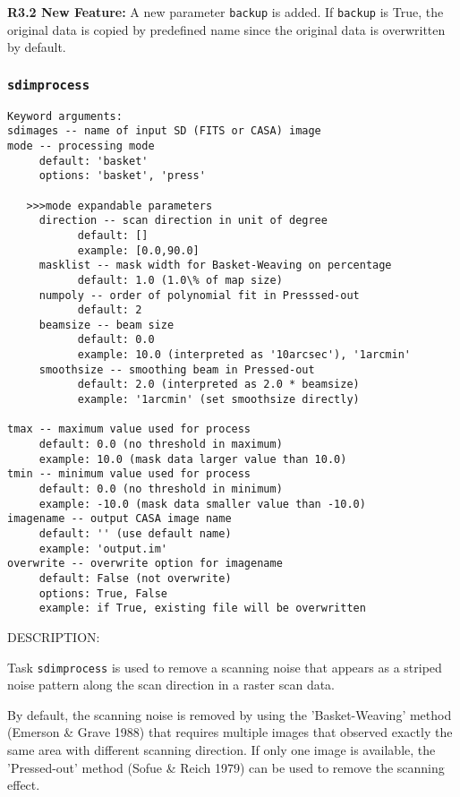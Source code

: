 \medskip
        {\bf R3.2 New Feature:}
        A new parameter {\tt backup} is added. If {\tt backup} is True, the original data is copied 
        by predefined name since the original data is overwritten by default.


\subsubsection{{\tt sdimprocess}}
\label{section:sd.sdtasks.tasks.sdimprocess}

\begin{verbatim}
Keyword arguments:
sdimages -- name of input SD (FITS or CASA) image
mode -- processing mode
     default: 'basket'
     options: 'basket', 'press'
     
   >>>mode expandable parameters
     direction -- scan direction in unit of degree
           default: []
           example: [0.0,90.0]
     masklist -- mask width for Basket-Weaving on percentage
           default: 1.0 (1.0\% of map size)
     numpoly -- order of polynomial fit in Presssed-out
           default: 2
     beamsize -- beam size 
           default: 0.0
           example: 10.0 (interpreted as '10arcsec'), '1arcmin'
     smoothsize -- smoothing beam in Pressed-out
           default: 2.0 (interpreted as 2.0 * beamsize)
           example: '1arcmin' (set smoothsize directly)
           
tmax -- maximum value used for process
     default: 0.0 (no threshold in maximum)
     example: 10.0 (mask data larger value than 10.0)
tmin -- minimum value used for process
     default: 0.0 (no threshold in minimum)
     example: -10.0 (mask data smaller value than -10.0)
imagename -- output CASA image name
     default: '' (use default name)
     example: 'output.im'
overwrite -- overwrite option for imagename
     default: False (not overwrite)
     options: True, False
     example: if True, existing file will be overwritten
\end{verbatim}

        DESCRIPTION:

        Task {\tt sdimprocess} is used to remove a scanning noise that appears 
        as a striped noise pattern along the scan direction in a raster 
        scan data. 

        By default, the scanning noise is removed by using the 
        'Basket-Weaving' method (Emerson \& Grave 1988) that requires 
        multiple images that observed exactly the same area with different 
        scanning direction. If only one image is available, the 'Pressed-out' 
method (Sofue \& Reich 1979) can be used to remove the scanning 
        effect.

